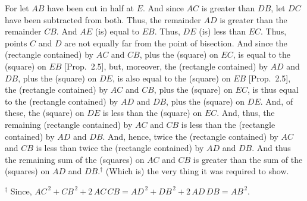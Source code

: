 \begin{Parallel}{}{}
{ For let $AB$ have been cut in half at $E$. And since $AC$ is greater than
 $DB$, let $DC$ have been subtracted from both. Thus, the remainder
 $AD$ is greater than the remainder $CB$. And $AE$ (is) equal to $EB$.
 Thus, $DE$ (is) less than $EC$. Thus, points $C$ and $D$ are not
 equally far from the point of bisection. And since the (rectangle
 contained) by $AC$ and $CB$, plus the (square) on $EC$,
 is equal to the (square) on $EB$ [Prop.~2.5], 
 but, moreover, the (rectangle contained) by $AD$ and $DB$, plus the
 (square) on $DE$, is also equal to the (square) on $EB$ [Prop.~2.5], the (rectangle contained) by $AC$ and
 $CB$, plus the (square) on $EC$, is thus equal to the (rectangle contained)
 by $AD$ and $DB$, plus the (square) on $DE$. And, of these, the
 (square) on $DE$ is less than the (square) on $EC$. And, thus, the remaining
 (rectangle contained) by $AC$ and $CB$ is  less than
 the (rectangle contained) by $AD$ and $DB$. And, hence, twice
 the (rectangle contained) by $AC$ and $CB$ is less than twice the
 (rectangle contained) by $AD$ and $DB$. And thus the remaining
 sum of the (squares) on $AC$ and $CB$ is greater than the sum of the
 (squares) on $AD$ and $DB$.$^\dag$  (Which is) the very thing it was required to show.}
\end{Parallel}
{\footnotesize\noindent$^\dag$ Since, $AC^{\,2}+CB^{\,2}+2\,AC\,CB=
 AD^{\,2}+DB^{\,2}
+2\,AD\,DB = AB^{\,2}$.} 

